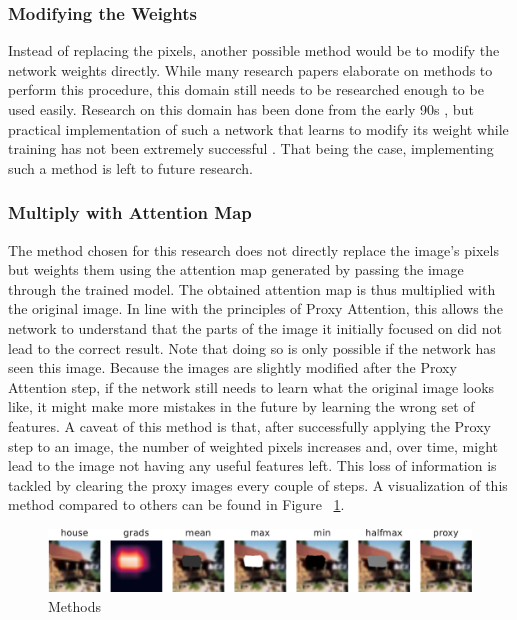\subsubsection{Modifying the Weights}
Instead of replacing the pixels, another possible method would be to modify the network weights directly. While many research papers elaborate on methods to perform this procedure, this domain still needs to be researched enough to be used easily. Research on this domain has been done from the early 90s \cite{schmidhuberSelfReferentialWeightMatrix1993}, but practical implementation of such a network that learns to modify its weight while training has not been extremely successful \cite{irieModernSelfReferentialWeight2022}.
That being the case, implementing such a method is left to future research.


\subsubsection{Multiply with Attention Map}
The method chosen for this research does not directly replace the image's pixels but weights them using the attention map generated by passing the image through the trained model.
The obtained attention map is thus multiplied with the original image. In line with the principles of Proxy Attention, this allows the network to understand that the parts of the image it initially focused on did not lead to the correct result. Note that doing so is only possible if the network has seen this image. Because the images are slightly modified after the Proxy Attention step, if the network still needs to learn what the original image looks like, it might make more mistakes in the future by learning the wrong set of features.
A caveat of this method is that, after successfully applying the Proxy step to an image, the number of weighted pixels increases and, over time, might lead to the image not having any useful features left. This loss of information is tackled by clearing the proxy images every couple of steps.
A visualization of this method compared to others can be found in Figure ~\ref{fig:methods}.

\begin{figure}[h]
    \centering
    \includegraphics[width=1\textwidth]{images/methods.pdf}
    \caption{Methods}
    \label{fig:methods}
\end{figure}

